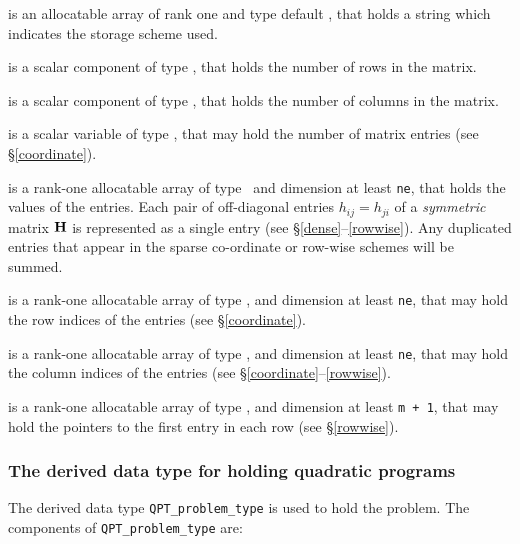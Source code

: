 \documentclass{galahad}
\newcommand{\packagename}{QPT}
\begin{document}
\begin{description}

 is an allocatable array of rank one and type default \character, that
holds a string which indicates the storage scheme used.

 is a scalar component of type \integer,
that holds the number of rows in the matrix.

 is a scalar component of type \integer,
that holds the number of columns in the matrix.

 is a scalar variable of type \integer, that may
hold the number of matrix entries (see \S\ref{coordinate}).

 is a rank-one allocatable array of type \realdp\,
and dimension at least {\tt ne}, that holds the values of the entries.
Each pair of off-diagonal entries $h_{ij} = h_{ji}$ of a {\em symmetric}
matrix ${\mathbf{H}}$ is represented as a single entry
(see \S\ref{dense}--\ref{rowwise}).
Any duplicated entries that appear in the sparse
co-ordinate or row-wise schemes will be summed.

 is a rank-one allocatable array of type \integer,
and dimension at least {\tt ne}, that may hold the row indices of the entries
(see \S\ref{coordinate}).

 is a rank-one allocatable array of type \integer,
and dimension at least {\tt ne}, that may hold the column indices of the entries
(see \S\ref{coordinate}--\ref{rowwise}).

 is a rank-one allocatable array of type \integer,
and dimension at least {\tt m + 1}, that may hold the pointers to
the first entry in each row (see \S\ref{rowwise}).

\end{description}


\subsubsection{The derived data type for holding quadratic programs}
\label{typeprob}

The derived data type
{\tt \packagename\_problem\_type}
is used to hold the problem.
The components of
{\tt \packagename\_problem\_type}
are:
\end{document}

